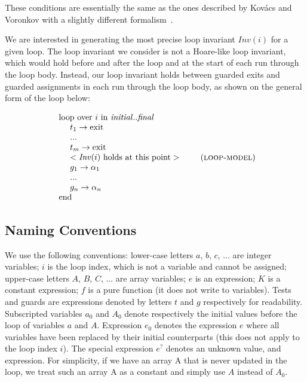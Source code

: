 \documentclass[a4paper,10pt]{article}
\newcommand{\idx}{\ensuremath{i}\xspace}
\newcommand{\idxinitial}{\ensuremath{\mathit{initial}}\xspace}
\newcommand{\idxfinal}{\ensuremath{\mathit{final}}\xspace}
\newcommand{\KWloop}{\ensuremath{\mathrm{loop}~}}
\newcommand{\KWend}{\ensuremath{\mathrm{end}~}}
\newcommand{\KWover}{\ensuremath{\mathrm{over}~}}
\newcommand{\KWin}{\ensuremath{~\mathrm{in}~}}
\newcommand{\KWexit}{\ensuremath{\mathrm{exit}}}
\newcommand{\Inv}[1]{\ensuremath{\mathit{Inv}(#1)\xspace}}
\newcommand{\loopmodel}{\textsc{loop-model}\xspace}
\begin{document}
These conditions are essentially the same as the ones described by Kov\'acs and
Voronkov with a slightly different formalism~\cite{kovacs:2009:fli}.

We are interested in generating the most precise loop invariant \Inv{\idx} for
a given loop. The loop invariant we consider is not a Hoare-like loop
invariant, which would hold before and after the loop and at the start of each
run through the loop body. Instead, our loop invariant holds between guarded
exits and guarded assignments in each run through the loop body, as shown on
the general form of the loop below:

\begin{align*}
\begin{array}{l}
  \KWloop \KWover i \KWin \idxinitial ..\idxfinal \\
  ~~~~ t_1 \rightarrow \KWexit \\
  ~~~~ ... \\
  ~~~~ t_m \rightarrow \KWexit \\
  ~~~~ < \textrm{\Inv{\idx} holds at this point} >\\
  ~~~~ g_1 \rightarrow \alpha_1 \\
  ~~~~ ... \\
  ~~~~ g_n \rightarrow \alpha_n \\
  \KWend
\end{array}
 \tag{\loopmodel}\\
\end{align*}

\subsection{Naming Conventions}
\label{sec:naming-conventions}

We use the following conventions: lower-case letters $a$, $b$, $c$, ... are integer
variables; \idx is the loop index, which is not a variable and cannot be
assigned; upper-case letters $A$, $B$, $C$, ... are array variables; $e$ is an
expression; $K$ is a constant expression; $f$ is a pure function (it does not
write to variables). Tests and guards are expressions denoted by letters $t$ and
$g$ respectively for readability. Subscripted variables $a_0$ and $A_0$ denote
respectively the initial values before the loop of variables $a$ and
$A$. Expression $e_0$ denotes the expression $e$ where all variables have been
replaced by their initial counterparts (this does not apply to the loop index
\idx).  The special expression $e^?$ denotes an unknown value, and expression.
For simplicity, if we have an array A that is never updated in the loop, we
treat such an array A as a constant and simply use $A$ instead of $A_0$.
\end{document}
